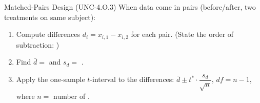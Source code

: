 \documentclass[10pt]{article}
\begin{document}
\begin{notesbox}{Matched-Pairs Design (UNC-4.O.3)}
When data come in pairs (before/after, two treatments on same subject):
\begin{enumerate}
    \item Compute differences $d_i = x_{i,1} - x_{i,2}$ for each pair.
          (State the order of subtraction: \writeline)
    \item Find $\bar d = $ \blank{3cm} and $s_d = $ \blank{3cm}.
    \item Apply the one-sample $t$-interval to the differences:
          $\bar d \pm t^* \cdot \dfrac{s_d}{\sqrt{n}}$, \quad $df = n - 1$,
          where $n = $ number of \blank{3cm}.
\end{enumerate}
\end{notesbox}
\end{document}
